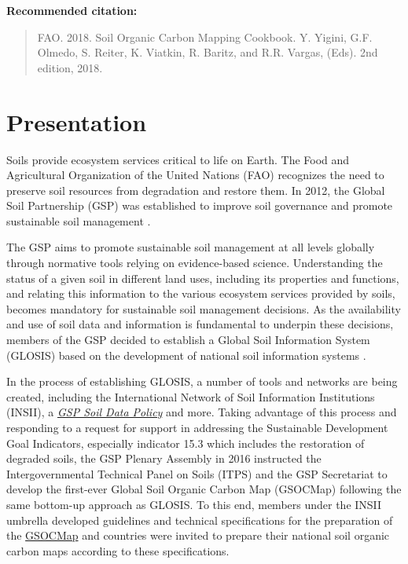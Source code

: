 \documentclass[10pt,b5paper,]{book}
\theoremstyle{definition}
\theoremstyle{definition}
\theoremstyle{definition}
\theoremstyle{remark}
\begin{document}
\vfill

\textbf{Recommended citation:}

\begin{quote}
FAO. 2018. Soil Organic Carbon Mapping Cookbook. Y. Yigini, G.F. Olmedo,
S. Reiter, K. Viatkin, R. Baritz, and R.R. Vargas, (Eds). 2nd edition,
2018.
\end{quote}

\mainmatter
\pagestyle{fancy}

\hypertarget{presentation}{%
\chapter{Presentation}\label{presentation}}

Soils provide ecosystem services critical to life on Earth. The Food and
Agricultural Organization of the United Nations (FAO) recognizes the
need to preserve soil resources from degradation and restore them. In
2012, the Global Soil Partnership (GSP) was established to improve soil
governance and promote sustainable soil management
.

The GSP aims to promote sustainable soil management
 at all levels globally through
normative tools relying on evidence-based science. Understanding the
status of a given soil in different land uses, including its properties
and functions, and relating this information to the various ecosystem
services provided by soils, becomes mandatory for sustainable soil
management  decisions. As the
availability and use of soil data and information is fundamental to
underpin these decisions, members of the GSP decided to establish a
Global Soil Information System (GLOSIS)
 based on the development of
national soil information systems
.

In the process of establishing GLOSIS, a number of tools and networks
are being created, including the International Network of Soil
Information Institutions (INSII), a
\href{http://www.fao.org/3/a-bs975e.pdf}{\emph{GSP Soil Data Policy}}
\citep{gsp_data_2017} and more. Taking advantage of this process and
responding to a request for support in addressing the Sustainable
Development Goal Indicators, especially indicator 15.3 which includes
the restoration of degraded soils, the GSP Plenary Assembly in 2016
instructed the Intergovernmental Technical Panel on Soils (ITPS) and the
GSP Secretariat to develop the first-ever Global Soil Organic Carbon Map
(GSOCMap)  following the
same bottom-up approach as GLOSIS. To this end, members under the INSII
umbrella developed guidelines and technical specifications for the
preparation of the \href{http://www.fao.org/3/a-bp164e.pdf}{GSOCMap}
 and countries were
invited to prepare their national soil organic carbon maps according to
these specifications.
\end{document}
